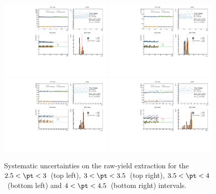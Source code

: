 \begin{figure}
    \centering
    \includegraphics[width=0.48\textwidth]{Figures/Chapter 5/AllPtBins/RawYieldSyst2.5_3.pdf}
    \includegraphics[width=0.48\textwidth]{Figures/Chapter 5/AllPtBins/RawYieldSyst3_3.5.pdf}
    \includegraphics[width=0.48\textwidth]{Figures/Chapter 5/AllPtBins/RawYieldSyst3.5_4.pdf}
    \includegraphics[width=0.48\textwidth]{Figures/Chapter 5/AllPtBins/RawYieldSyst4_4.5.pdf}
    \caption{Systematic uncertainties on the raw-yield extraction for the $2.5 < \pt < 3$~\gevc (top left), $3 < \pt < 3.5$~\gevc (top right), $3.5 < \pt < 4$~\gevc (bottom left) and $4 < \pt < 4.5$~\gevc (bottom right) intervals.}
\end{figure}

